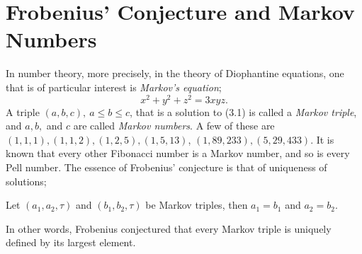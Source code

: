 \chapter{Frobenius' Conjecture and Markov Numbers}
In number theory, more precisely, in the theory of Diophantine equations, one that is of particular interest is \emph{Markov's equation};
\begin{equation}\label{Markov}
    x^2 + y^2 + z^2 = 3xyz.
\end{equation}
A triple $(a,b,c), \ a \leq b \leq c$, that is a solution to (3.1) is called a \emph{Markov triple}, and $a,b,$ and $c$ are called \emph{Markov numbers}. A few of these are $(1,1,1),(1,1,2), (1,2,5), (1,5,13)$, $(1, 89, 233), (5, 29, 433)$. It is known that every other Fibonacci number is a Markov number, and so is every Pell number. The essence of Frobenius' conjecture is that of uniqueness of solutions;
\begin{conjecture}\label{frobconj}
    Let $(a_1,a_2,\tau)$ and $(b_1,b_2,\tau)$ be Markov triples, then $a_1 = b_1$ and $a_2=b_2$. 
\end{conjecture}
In other words, Frobenius conjectured that every Markov triple is uniquely defined by its largest element. 
